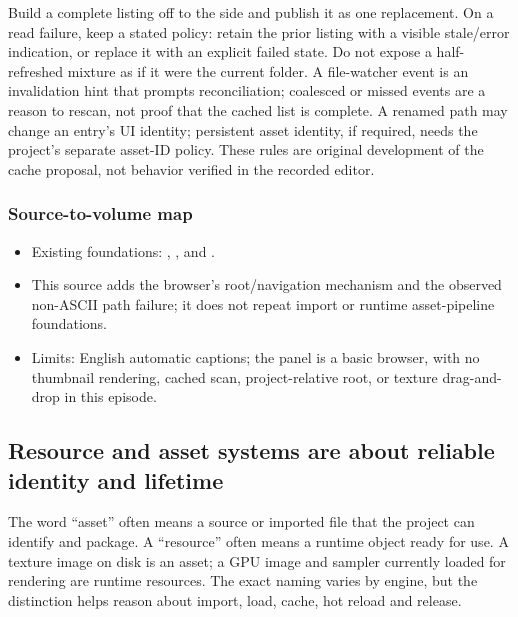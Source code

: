 Build a complete listing off to the side and publish it as one replacement. On a read failure, keep a stated policy: retain the prior listing with a visible stale/error indication, or replace it with an explicit failed state. Do not expose a half-refreshed mixture as if it were the current folder. A file-watcher event is an invalidation hint that prompts reconciliation; coalesced or missed events are a reason to rescan, not proof that the cached list is complete. A renamed path may change an entry's UI identity; persistent asset identity, if required, needs the project's separate asset-ID policy. These rules are original development of the cache proposal, not behavior verified in the recorded editor.

\subsubsection{Source-to-volume map}\label{06-engine-ii-ch027-source-to-volume-map}

\hypertarget{06-engine-ii-ch027-source-to-volume-map}{}

\begin{itemize}
\tightlist
\item
  Existing foundations: , , and .
\item
  This source adds the browser's root/navigation mechanism and the observed non-ASCII path failure; it does not repeat import or runtime asset-pipeline foundations.
\item
  Limits: English automatic captions; the panel is a basic browser, with no thumbnail rendering, cached scan, project-relative root, or texture drag-and-drop in this episode.
\end{itemize}

\subsection{Resource and asset systems are about reliable identity and lifetime}\label{06-engine-ii-ch027-resource-and-asset-systems-are-about-reliable-identity-and-lifetime}

\hypertarget{06-engine-ii-ch027-resource-and-asset-systems-are-about-reliable-identity-and-lifetime}{}

The word ``asset'' often means a source or imported file that the project can identify and package. A ``resource'' often means a runtime object ready for use. A texture image on disk is an asset; a GPU image and sampler currently loaded for rendering are runtime resources. The exact naming varies by engine, but the distinction helps reason about import, load, cache, hot reload and release.

